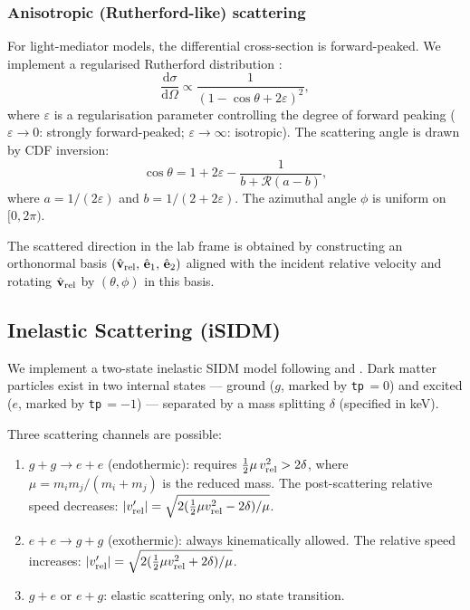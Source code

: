 \documentclass[fleqn,usenatbib]{mnras}
\newcommand{\code}[1]{\texttt{#1}}
\newcommand{\vrel}{v_{\rm rel}}
\begin{document}
\subsubsection{Anisotropic (Rutherford-like) scattering}
\label{sec:sidm_anisotropic}

For light-mediator models, the differential cross-section is
forward-peaked.  We implement a regularised Rutherford distribution
\citep{Kahlhoefer2014,Robertson2017}:
\begin{equation}
\frac{\mathrm{d}\sigma}{\mathrm{d}\Omega}
  \propto \frac{1}{(1 - \cos\theta + 2\varepsilon)^2},
\label{eq:rutherford}
\end{equation}
where $\varepsilon$ is a regularisation parameter controlling the
degree of forward peaking ($\varepsilon \to 0$: strongly
forward-peaked; $\varepsilon \to \infty$: isotropic).  The scattering
angle is drawn by CDF inversion:
\begin{equation}
\cos\theta = 1 + 2\varepsilon
  - \frac{1}{b + \mathcal{R}(a - b)},
\label{eq:rutherford_sample}
\end{equation}
where $a = 1/(2\varepsilon)$ and $b = 1/(2+2\varepsilon)$.  The
azimuthal angle $\phi$ is uniform on $[0,2\pi)$.

The scattered direction in the lab frame is obtained by constructing
an orthonormal basis $(\hat{\mathbf{v}}_{\rm rel},\,\hat{\mathbf{e}}_1,\,
\hat{\mathbf{e}}_2)$ aligned with the incident relative velocity and
rotating $\hat{\mathbf{v}}_{\rm rel}$ by $(\theta,\phi)$ in this
basis.

\subsection{Inelastic Scattering (iSIDM)}
\label{sec:sidm_inelastic}

We implement a two-state inelastic SIDM model following
\citet{TuckerSmith2001} and \citet{Vogelsberger2019}.  Dark matter
particles exist in two internal states --- ground ($g$, marked by
\code{tp}$\,=0$) and excited ($e$, marked by \code{tp}$\,=-1$) ---
separated by a mass splitting $\delta$ (specified in keV).

Three scattering channels are possible:
\begin{enumerate}
\item $g + g \to e + e$ (endothermic): requires
  $\frac{1}{2}\mu\,\vrel^2 > 2\delta$, where
  $\mu = m_i m_j/(m_i+m_j)$ is the reduced mass.  The post-scattering
  relative speed decreases:
  $|\vrel'| = \sqrt{2(\tfrac{1}{2}\mu\vrel^2 - 2\delta)/\mu}$.

\item $e + e \to g + g$ (exothermic): always kinematically allowed.
  The relative speed increases:
  $|\vrel'| = \sqrt{2(\tfrac{1}{2}\mu\vrel^2 + 2\delta)/\mu}$.

\item $g + e$ or $e + g$: elastic scattering only, no state
  transition.
\end{enumerate}
\end{document}
